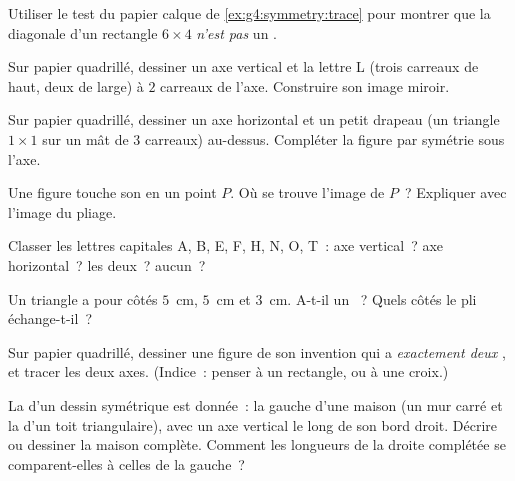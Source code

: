 \begin{exercise}[$\star$]\label{exo:g4:symmetry:3}
Utiliser le test du papier calque de \cref{ex:g4:symmetry:trace}
pour montrer que la diagonale d'un rectangle $6 \times 4$
\emph{n'est pas} un .
\end{exercise}

\begin{exercise}[$\star$]\label{exo:g4:symmetry:4}
Sur papier quadrillé, dessiner un axe vertical et la lettre L
(trois carreaux de haut, deux de large) à $2$ carreaux de l'axe.
Construire son image miroir.
\end{exercise}

\begin{exercise}[$\star$]\label{exo:g4:symmetry:5}
Sur papier quadrillé, dessiner un axe horizontal et un petit
drapeau (un triangle $1 \times 1$ sur un mât de $3$ carreaux)
au-dessus. Compléter la figure par symétrie sous l'axe.
\end{exercise}

\begin{exercise}[$\star$]\label{exo:g4:symmetry:6}
Une figure touche son  en un point $P$. Où se trouve
l'image de $P$~? Expliquer avec l'image du pliage.
\end{exercise}

\begin{exercise}[$\star$]\label{exo:g4:symmetry:7}
Classer les lettres capitales A, B, E, F, H, N, O, T~: axe
vertical~? axe horizontal~? les deux~? aucun~?
\end{exercise}

\begin{exercise}[$\star$]\label{exo:g4:symmetry:8}
Un triangle a pour côtés $5$~cm, $5$~cm et $3$~cm. A-t-il un ~? Quels côtés le pli échange-t-il~?
\end{exercise}

\begin{exercise}[$\star\star$]\label{exo:g4:symmetry:9}
Sur papier quadrillé, dessiner une figure de son invention qui a
\emph{exactement deux} , et tracer les deux axes.
(Indice~: penser à un rectangle, ou à une croix.)
\end{exercise}

\begin{exercise}[$\star\star$]\label{exo:g4:symmetry:10}
La  d'un dessin symétrique est donnée~: la  gauche d'une
maison (un mur carré et la  d'un toit triangulaire), avec un
axe vertical le long de son bord droit. Décrire ou dessiner la
maison complète. Comment les longueurs de la  droite complétée
se comparent-elles à celles de la  gauche~?
\end{exercise}

